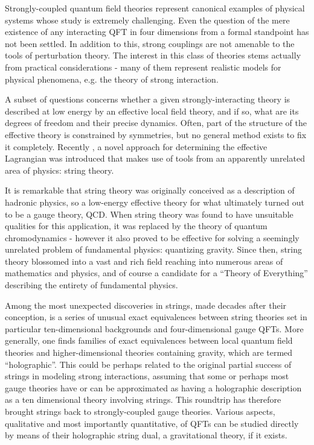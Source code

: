 Strongly-coupled quantum field theories represent canonical examples of physical systems whose study is extremely challenging. Even the question of the mere existence of any interacting QFT in four dimensions from a formal standpoint has not been settled. In addition to this, strong couplings are not amenable to the tools of perturbation theory. The interest in this class of theories stems actually from practical considerations - many of them represent realistic models for physical phenomena, e.g. the theory of strong interaction.

A subset of questions concerns whether a given strongly-interacting theory is described at low energy by an effective local field theory, and if so, what are its degrees of freedom and their precise dynamics. Often, part of the structure of the effective theory is constrained by symmetries, but no general method exists to fix it completely. Recently \cite{MZ}, a novel approach for determining the effective Lagrangian was introduced that makes use of tools from an apparently unrelated area of physics: string theory.

It is remarkable that string theory was originally conceived as a description of hadronic physics, so a low-energy effective theory for what ultimately turned out to be a gauge theory, QCD. When string theory was found to have unsuitable qualities for this application, it was replaced by the theory of quantum chromodynamics - however it also proved to be effective for solving a seemingly unrelated problem of fundamental physics: quantizing gravity. Since then, string theory blossomed into a vast and rich field reaching into numerous areas of mathematics and physics, and of course a candidate for a ``Theory of Everything'' describing the entirety of fundamental physics.

Among the most unexpected discoveries in strings, made decades after their conception, is a series of unusual exact equivalences between string theories set in particular ten-dimensional backgrounds and four-dimensional gauge QFTs. More ge\-ne\-ral\-ly, one finds families of exact equivalences between local quantum field theories and higher-dimensional theories containing gravity, which are termed ``holographic''. This could be perhaps related to the original partial success of strings in modeling strong interactions, assuming that some or perhaps most gauge theories have or can be approximated as having a holographic description as a ten dimensional theory involving strings. This roundtrip has therefore brought strings back to strongly-coupled gauge theories. Various aspects, qualitative and most importantly quantitative, of QFTs can be studied directly by means of their holographic string dual, a gravitational theory, if it exists. 

